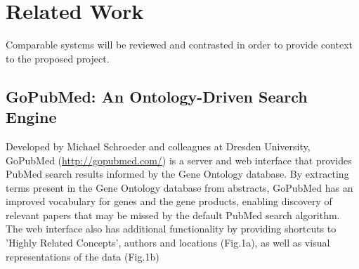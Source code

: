 \documentclass[PROP_AGutteridge_CS.tex]{subfiles}
\begin{document}
\chapter{Related Work}
Comparable systems will be reviewed and contrasted in order to provide context to the proposed project.

\section{GoPubMed: An Ontology-Driven Search Engine}
Developed by Michael Schroeder and colleagues at Dresden University, GoPubMed (\url{http://gopubmed.com/}) is a server and web interface that provides PubMed search results informed by the Gene Ontology database\cite{doms}. By extracting terms present in the Gene Ontology database from abstracts, GoPubMed has an improved vocabulary for genes and the gene products, enabling discovery of relevant papers that may be missed by the default PubMed search algorithm. The web interface also has additional functionality by providing shortcuts to 'Highly Related Concepts', authors and locations (Fig.1a), as well as visual representations of the data (Fig.1b) \\
\end{document}
